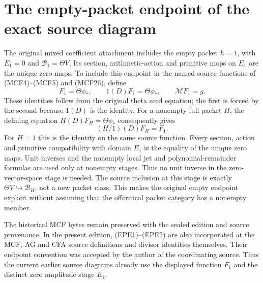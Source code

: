 \section{The empty-packet endpoint of the exact source diagram}
\label{sec:EPE}
The original mixed coefficient attachment includes the empty packet
$h=1$, with $E_1=0$ and $\mathscr B_1=\Theta V$. Its section,
arithmetic-action and primitive maps on $E_1$ are the unique zero maps.
To include this endpoint in the named source functions of
(MCF4)--(MCF5) and (MCF26), define
\[
 F_1=\Theta\phi_*,\qquad 1(D)F_1=\Theta\phi_*,\qquad
 \mathcal MF_1=g.
 \tag{EPE1}
\]
These identities follow from the original theta seed equation; the
first is forced by the second because $1(D)$ is the identity.
For a nonempty full packet $H$, the defining equation
$H(D)F_H=\Theta\phi_*$ consequently gives
\[
 (H/1)(D)F_H=F_1.
 \tag{EPE2}
\]
For $H=1$ this is the identity on the same source function.
Every section, action and primitive compatibility with domain $E_1$
is the equality of the unique zero maps. Unit inverses and the
nonempty local jet and polynomial-remainder formulas are used only
at nonempty stages. Thus no unit inverse in the zero-vector-space
stage is needed. The source inclusion at this stage is exactly
$\Theta V\hookrightarrow\mathscr B_H$, not a new packet class.
This makes the original empty endpoint explicit without assuming
that the offcritical packet category has a nonempty member.

The historical MCF bytes remain preserved with the sealed edition
and source provenance. In the present edition, (EPE1)--(EPE2) are
also incorporated at the MCF, AG and CFA source definitions and
divisor identities themselves. Their endpoint convention was accepted
by the author of the coordinating source. Thus the current earlier
source diagrams already use the displayed function $F_1$ and the
distinct zero amplitude stage $E_1$.
